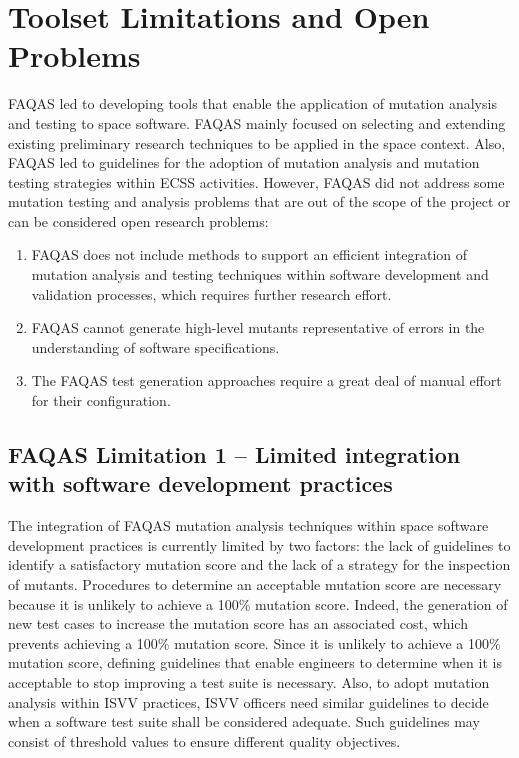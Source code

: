 \STARTCHANGEDWPT

\section{Toolset Limitations and Open Problems}
\label{sec:limitations}

FAQAS led to developing tools that enable the application of mutation analysis and testing to space software. FAQAS mainly focused on selecting and extending existing preliminary research techniques to be applied in the space context. Also, FAQAS led to guidelines for the adoption of mutation analysis and mutation testing strategies within ECSS activities. However, FAQAS did not address some mutation testing and analysis problems that are out of the scope of the project or can be considered open research problems:
\begin{enumerate}
\item FAQAS does not include methods to support an efficient integration of mutation analysis and testing techniques within software development and validation processes, which requires further research effort.
\item FAQAS cannot generate high-level mutants representative of errors in the understanding of software specifications.
\item The FAQAS test generation approaches require a great deal of manual effort for their configuration.
\end{enumerate}

\subsection{FAQAS Limitation 1 – Limited integration with software development practices}
%
The integration of FAQAS mutation analysis techniques within space software development practices is currently limited by two factors: the lack of guidelines to identify a satisfactory mutation score and the lack of a strategy for the inspection of mutants. Procedures to determine an acceptable mutation score are necessary because it is unlikely to achieve a 100\% mutation score. Indeed, the generation of new test cases to increase the mutation score has an associated cost, which prevents achieving a 100\% mutation score. 
Since it is unlikely to achieve a 100\% mutation score, defining guidelines that enable engineers to determine when it is acceptable to stop improving a test suite is necessary. Also, to adopt mutation analysis within ISVV practices, ISVV officers need similar guidelines to decide when a software test suite shall be considered adequate. Such guidelines may consist of threshold values to ensure different quality objectives.

